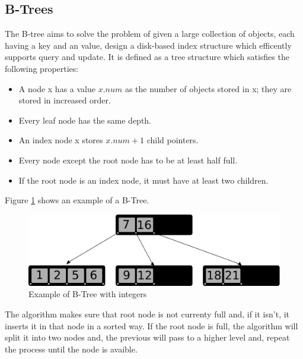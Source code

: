 \documentclass{sig-alternate-05-2015}
\begin{document}
    \subsection{B-Trees}
      The B-tree aims to solve the problem of given a large collection of objects, each having a key and an
      value, design a disk-based index structure which efficently supports query and update. It is defined as a tree
      structure which satisfies the following properties:
      \begin{itemize}
        \item A node x has a value $x.num$ as the number of objects stored in x; they are stored in increased order.
        \item Every leaf node has the same depth.
        \item An index node x stores $x.num+1$ child pointers.
        \item Every node except the root node has to be at least half full.
        \item If the root node is an index node, it must have at least two children.
      \end{itemize}
      Figure \ref{img:BTree} shows an example of a B-Tree.
      \begin{figure}[b]
        \centering
        \includegraphics[scale=0.45]{BTree.pdf}
        \caption{Example of B-Tree with integers}
        \label{img:BTree}
      \end{figure}
      The algorithm makes sure that root node is not currenty full and, if it isn't, it inserts it in that node in a sorted
      way. If the root node is full, the algorithm will split it into two nodes and, the previous will pass to a higher level and,
      repeat the process until the node is avaible.
\end{document}
